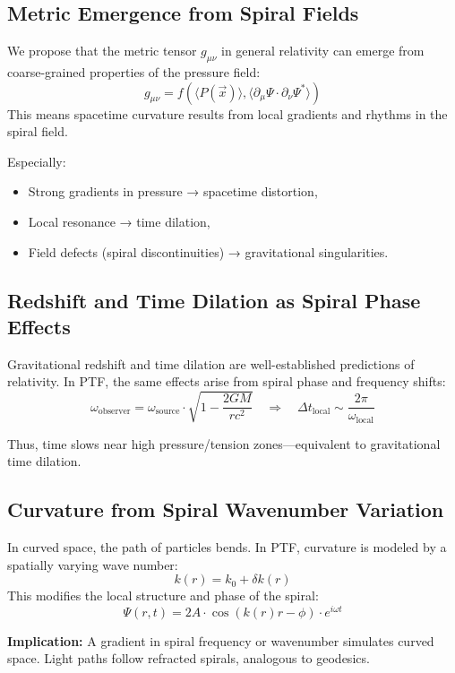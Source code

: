 \documentclass[a4paper,12pt]{article}
\begin{document}
\subsection{Metric Emergence from Spiral Fields}

We propose that the metric tensor \(g_{\mu\nu}\) in general relativity can emerge from coarse-grained properties of the pressure field:
\[
g_{\mu\nu} = f\left( \langle P(\vec{x}) \rangle, \langle \partial_\mu \Psi \cdot \partial_\nu \Psi^* \rangle \right)
\]
This means spacetime curvature results from local gradients and rhythms in the spiral field.

Especially:
\begin{itemize}
    \item Strong gradients in pressure → spacetime distortion,
    \item Local resonance → time dilation,
    \item Field defects (spiral discontinuities) → gravitational singularities.
\end{itemize}

\subsection{Redshift and Time Dilation as Spiral Phase Effects}

Gravitational redshift and time dilation are well-established predictions of relativity.  
In PTF, the same effects arise from spiral phase and frequency shifts:
\[
\omega_{\text{observer}} = \omega_{\text{source}} \cdot \sqrt{1 - \frac{2GM}{r c^2}} \quad \Rightarrow \quad \Delta t_{\text{local}} \sim \frac{2\pi}{\omega_{\text{local}}}
\]

Thus, time slows near high pressure/tension zones—equivalent to gravitational time dilation.

\subsection{Curvature from Spiral Wavenumber Variation}

In curved space, the path of particles bends.  
In PTF, curvature is modeled by a spatially varying wave number:
\[
k(r) = k_0 + \delta k(r)
\]
This modifies the local structure and phase of the spiral:
\[
\Psi(r, t) = 2A \cdot \cos(k(r)r - \phi) \cdot e^{i\omega t}
\]

\textbf{Implication:} A gradient in spiral frequency or wavenumber simulates curved space. Light paths follow refracted spirals, analogous to geodesics.
\end{document}
